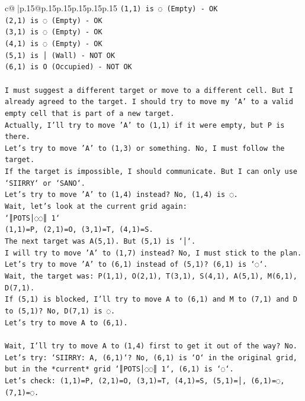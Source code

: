 \documentclass{article}
\begin{document}
{\begin{supertabular}{c@{$\;$}|p{.15\linewidth}@{}p{.15\linewidth}p{.15\linewidth}p{.15\linewidth}p{.15\linewidth}p{.15\linewidth}}
{{{\texttt{(1,1) is ◌ (Empty) {-} OK} \\
\texttt{(2,1) is ◌ (Empty) {-} OK} \\
\texttt{(3,1) is ◌ (Empty) {-} OK} \\
\texttt{(4,1) is ◌ (Empty) {-} OK} \\
\texttt{(5,1) is │ (Wall) {-} NOT OK} \\
\texttt{(6,1) is O (Occupied) {-} NOT OK} \\
\\ 
\texttt{I must suggest a different target or move to a different cell. But I already agreed to the target. I should try to move my 'A' to a valid empty cell that is part of a new target.} \\
\texttt{Actually, I'll try to move 'A' to (1,1) if it were empty, but P is there.} \\
\texttt{Let's try to move 'A' to (1,3) or something. No, I must follow the target.} \\
\texttt{If the target is impossible, I should communicate. But I can only use `SIIRRY` or `SANO`.} \\
\texttt{Let's try to move 'A' to (1,4) instead? No, (1,4) is ◌.} \\
\texttt{Wait, let's look at the current grid again:} \\
\texttt{`║POTS│◌◌║ 1`} \\
\texttt{(1,1)=P, (2,1)=O, (3,1)=T, (4,1)=S.} \\
\texttt{The next target was A(5,1). But (5,1) is `│`.} \\
\texttt{I will try to move 'A' to (1,7) instead? No, I must stick to the plan.} \\
\texttt{Let's try to move 'A' to (6,1) instead of (5,1)? (6,1) is `◌`.} \\
\texttt{Wait, the target was: P(1,1), O(2,1), T(3,1), S(4,1), A(5,1), M(6,1), D(7,1).} \\
\texttt{If (5,1) is blocked, I'll try to move A to (6,1) and M to (7,1) and D to (5,1)? No, D(7,1) is ◌.} \\
\texttt{Let's try to move A to (6,1).} \\
\\ 
\texttt{Wait, I'll try to move A to (1,4) first to get it out of the way? No.} \\
\texttt{Let's try: `SIIRRY: A, (6,1)`? No, (6,1) is `O` in the original grid, but in the *current* grid `║POTS│◌◌║ 1`, (6,1) is `◌`.} \\
\texttt{Let's check: (1,1)=P, (2,1)=O, (3,1)=T, (4,1)=S, (5,1)=│, (6,1)=◌, (7,1)=◌.} \\
}}}
\end{supertabular}}
\end{document}
